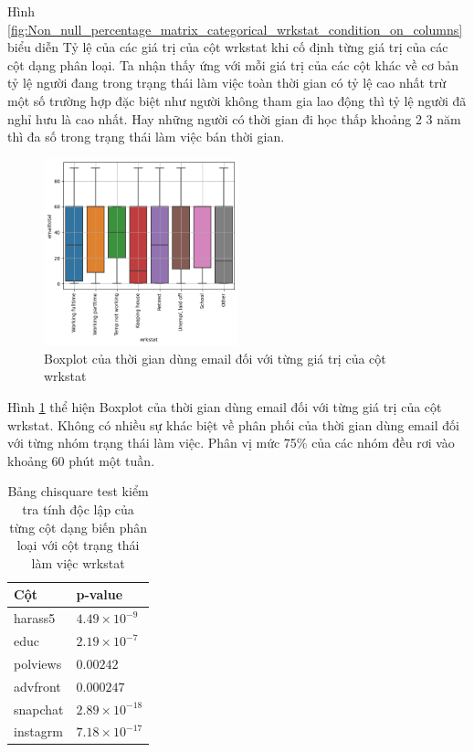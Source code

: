 Hình \ref{fig:Non_null_percentage_matrix_categorical_wrkstat_condition_on_columns} biểu diễn Tỷ lệ của các giá trị của cột wrkstat khi cố định từng giá trị của các cột dạng phân loại.
Ta nhận thấy ứng với mỗi giá trị của các cột khác về cơ bản tỷ lệ người đang trong trạng thái làm việc toàn thời gian có tỷ lệ cao nhất trừ một số trường hợp đặc biệt như người không tham gia lao động thì tỷ lệ người đã nghỉ hưu là cao nhất.
Hay những người có thời gian đi học thấp khoảng 2 3 năm thì đa số trong trạng thái làm việc bán thời gian.

\begin{figure}[H]
    \centering
    \includegraphics[width=0.5\textwidth]{figures/Thanh/Data_Analysis/Non_null_boxplot_emailtotal_vs_wrkstat_labels.png}
    \caption{Boxplot của thời gian dùng email đối với từng giá trị của cột wrkstat}
    \label{fig:Non_null_boxplot_emailtotal_vs_wrkstat_labels}
\end{figure}

Hình \ref{fig:Non_null_boxplot_emailtotal_vs_wrkstat_labels} thể hiện Boxplot của thời gian dùng email đối với từng giá trị của cột wrkstat.
Không có nhiều sự khác biệt về phân phối của thời gian dùng email đối với từng nhóm trạng thái làm việc.
Phân vị mức 75\% của các nhóm đều rơi vào khoảng 60 phút một tuần.

\begin{table}[ht]
    \centering
    \begin{tabular}{|l|l|}
    \hline
    Cột & p-value \\
    \hline
    harass5 & $4.49 \times 10^{-9}$ \\
    \hline
    educ & $2.19 \times 10^{-7}$ \\
    \hline
    polviews & $0.00242$ \\
    \hline
    advfront & $0.000247$ \\
    \hline
    snapchat & $2.89 \times 10^{-18}$ \\
    \hline
    instagrm & $7.18 \times 10^{-17}$ \\
    \hline
    \end{tabular}
    \caption{Bảng chisquare test kiểm tra tính độc lập của từng cột dạng biến phân loại với cột trạng thái làm việc wrkstat}
    \label{tab:Non_null_chisquare_test}
\end{table}

